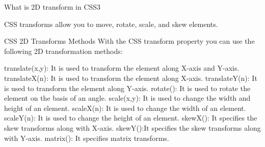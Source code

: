 What is 2D transform in CSS3 

CSS transforms allow you to move, rotate, scale, and skew elements.

CSS 2D Transforms Methods
With the CSS transform property you can use the following 2D transformation methods:

translate(x,y): It is used to transform the element along X-axis and Y-axis.
translateX(n): It is used to transform the element along X-axis.
translateY(n): It is used to transform the element along Y-axis.
rotate(): It is used to rotate the element on the basis of an angle.
scale(x,y): It is used to change the width and height of an element.
scaleX(n): It is used to change the width of an element.
scaleY(n): It is used to change the height of an element.
skewX(): It specifies the skew transforms along with X-axis.
skewY():It specifies the skew transforms along with Y-axis.
matrix(): It specifies matrix transforms.